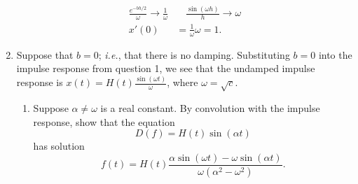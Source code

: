 \documentclass{article}
\begin{document}
\begin{enumerate}
\begin{align*}
			\frac{e^{-bh/2}}{\omega}\to \frac{1}{\omega} &\quad \frac{\sin(\omega h)}{h}\to \omega\\
			x'(0)&=\frac{1}{\omega}\omega=1.
		\end{align*}
	\item Suppose that $b=0$; \textit{i.e.}, that there is no damping. Substituting $b=0$ into the impulse response from question 1, we see that the undamped impulse response is $x(t)=H(t)\frac{\sin(\omega t)}{\omega}$, where $\omega=\sqrt{c}$.
		\begin{enumerate}
			\item Suppose $\alpha\neq \omega$ is a real constant. By convolution with the impulse response, show that the equation
				\[D(f)=H(t)\sin(\alpha t)\]
				has solution
				\[f(t)=H(t)\frac{\alpha\sin(\omega t)-\omega\sin(\alpha t)}{\omega(\alpha^2-\omega^2)}.\]
				
				
				
				\iffalse
				
				
				
				
				

\end{enumerate}
\end{enumerate}
\end{document}
